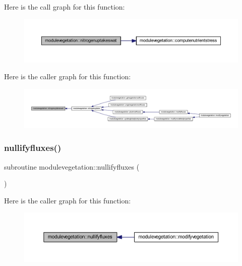 Here is the call graph for this function\+:\nopagebreak
\begin{figure}[H]
\begin{center}
\leavevmode
\includegraphics[width=350pt]{namespacemodulevegetation_a5c30bda27fd79a69f45cc6fd35a2f0af_cgraph}
\end{center}
\end{figure}
Here is the caller graph for this function\+:\nopagebreak
\begin{figure}[H]
\begin{center}
\leavevmode
\includegraphics[width=350pt]{namespacemodulevegetation_a5c30bda27fd79a69f45cc6fd35a2f0af_icgraph}
\end{center}
\end{figure}
\mbox{\label{namespacemodulevegetation_a902f9aa035167e92ff669898d4bb5c14}} 
\subsubsection{\texorpdfstring{nullifyfluxes()}{nullifyfluxes()}}
{\footnotesize\ttfamily subroutine modulevegetation\+::nullifyfluxes (\begin{DoxyParamCaption}{ }\end{DoxyParamCaption})\hspace{0.3cm}{\ttfamily [private]}}

Here is the caller graph for this function\+:\nopagebreak
\begin{figure}[H]
\begin{center}
\leavevmode
\includegraphics[width=350pt]{namespacemodulevegetation_a902f9aa035167e92ff669898d4bb5c14_icgraph}
\end{center}
\end{figure}
\mbox{\label{namespacemodulevegetation_af6d8868a0a498022d072c484bbfc5f73}} 
